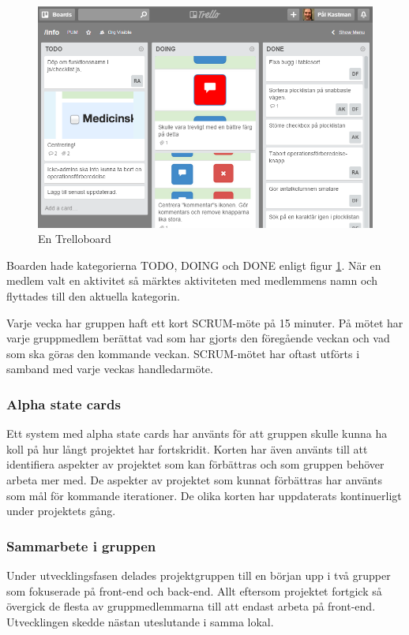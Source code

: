 \documentclass{article}
\begin{document}
\begin{figure}[H]
	\begin{center}
	\includegraphics[scale=0.5]{trello2.png}
	\caption{En Trelloboard}
	\label{fig:trello2}
	\end{center}
\end{figure}

Boarden hade kategorierna TODO, DOING och DONE enligt figur \ref{fig:trello2}. När en medlem valt en aktivitet så märktes aktiviteten med medlemmens namn och flyttades till den aktuella kategorin. 

Varje vecka har gruppen haft ett kort SCRUM-möte på 15 minuter. På mötet har varje gruppmedlem berättat vad som har gjorts den föregående veckan och vad som ska göras den kommande veckan. SCRUM-mötet har oftast utförts i samband med varje veckas handledarmöte.

\subsubsection{Alpha state cards}
Ett system med alpha state cards har använts för att gruppen skulle kunna ha koll på hur långt projektet har fortskridit. Korten har även använts till att identifiera aspekter av projektet som kan förbättras och som gruppen behöver arbeta mer med. De aspekter av projektet som kunnat förbättras har använts som mål för kommande iterationer. De olika korten har uppdaterats kontinuerligt under projektets gång.

\subsubsection{Sammarbete i gruppen}
Under utvecklingsfasen delades projektgruppen till en början upp i två grupper som fokuserade på front-end och back-end. Allt eftersom projektet fortgick så övergick de flesta av gruppmedlemmarna till att endast arbeta på front-end. Utvecklingen skedde nästan uteslutande i samma lokal.
\end{document}
